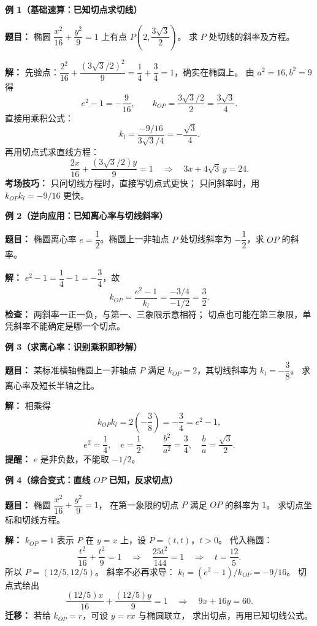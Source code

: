 \begin{examplebox}
\textbf{\textcolor{CExample}{例 1（基础速算：已知切点求切线）}}

\textbf{题目：} 椭圆 $\dfrac{x^2}{16}+\dfrac{y^2}{9}=1$ 上有点
$P\left(2,\dfrac{3\sqrt3}{2}\right)$。
求 $P$ 处切线的斜率及方程。

\textbf{解：} 先验点：$\dfrac{2^2}{16}+\dfrac{(3\sqrt3/2)^2}{9}
=\dfrac14+\dfrac34=1$，确实在椭圆上。
由 $a^2=16,b^2=9$ 得
\[
 e^2-1=-\frac9{16},\qquad
 k_{OP}=\frac{3\sqrt3/2}{2}=\frac{3\sqrt3}{4}.
\]
直接用乘积公式：
\[
 k_l=\frac{-9/16}{3\sqrt3/4}=-\frac{\sqrt3}{4}.
\]
再用切点式求直线方程：
\[
 \frac{2x}{16}+\frac{(3\sqrt3/2)y}{9}=1
 \quad\Longrightarrow\quad
 \boxed{3x+4\sqrt3\,y=24}.
\]
\textbf{考场技巧：} 只问切线方程时，直接写切点式更快；
只问斜率时，用 $k_{OP}k_l=-9/16$ 更快。

\medskip
\textbf{\textcolor{CExample}{例 2（逆向应用：已知离心率与切线斜率）}}

\textbf{题目：} 椭圆离心率 $e=\dfrac12$。椭圆上一非轴点
$P$ 处切线斜率为 $-\dfrac12$，求 $OP$ 的斜率。

\textbf{解：} $e^2-1=\dfrac14-1=-\dfrac34$，故
\[
 k_{OP}=\frac{e^2-1}{k_l}
       =\frac{-3/4}{-1/2}=\boxed{\frac32}.
\]
\textbf{检查：} 两斜率一正一负，与第一、三象限示意相符；
切点也可能在第三象限，单凭斜率不能确定是哪一个切点。

\medskip
\textbf{\textcolor{CExample}{例 3（求离心率：识别乘积即秒解）}}

\textbf{题目：} 某标准横轴椭圆上一非轴点 $P$ 满足
$k_{OP}=2$，其切线斜率为 $k_l=-\dfrac38$。
求离心率及短长半轴之比。

\textbf{解：} 相乘得
\[
 k_{OP}k_l=2\left(-\frac38\right)=-\frac34=e^2-1,
\]
\[
 e^2=\frac14,\quad \boxed{e=\frac12},\qquad
 \frac{b^2}{a^2}=\frac34,\quad
 \boxed{\frac ba=\frac{\sqrt3}{2}}.
\]
\textbf{提醒：} $e$ 是非负数，不能取 $-1/2$。

\medskip
\textbf{\textcolor{CExample}{例 4（综合变式：直线 $OP$ 已知，反求切点）}}

\textbf{题目：} 椭圆 $\dfrac{x^2}{16}+\dfrac{y^2}{9}=1$，
在第一象限的切点 $P$ 满足 $OP$ 的斜率为 $1$。
求切点坐标和切线方程。

\textbf{解：} $k_{OP}=1$ 表示 $P$ 在 $y=x$ 上，设 $P=(t,t)$，$t>0$。
代入椭圆：
\[
 \frac{t^2}{16}+\frac{t^2}{9}=1
 \quad\Longrightarrow\quad
 \frac{25t^2}{144}=1
 \quad\Longrightarrow\quad t=\frac{12}{5}.
\]
所以 $P=(12/5,12/5)$。
斜率不必再求导：
$k_l=(e^2-1)/k_{OP}=-9/16$。
切点式给出
\[
 \frac{(12/5)x}{16}+\frac{(12/5)y}{9}=1
 \quad\Longrightarrow\quad \boxed{9x+16y=60}.
\]
\textbf{迁移：} 若给 $k_{OP}=r$，可设 $y=rx$ 与椭圆联立，
求出切点，再用已知切线公式。


\end{examplebox}
